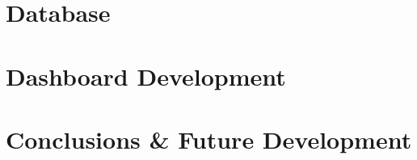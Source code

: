 \documentclass[a4paper,12pt,twoside]{report}
\begin{document}
% 	

\chapter{Database}



\chapter{Dashboard Development}



\chapter{Conclusions \& Future Development}





\cleardoublepage


\listoffigures
\end{document}
